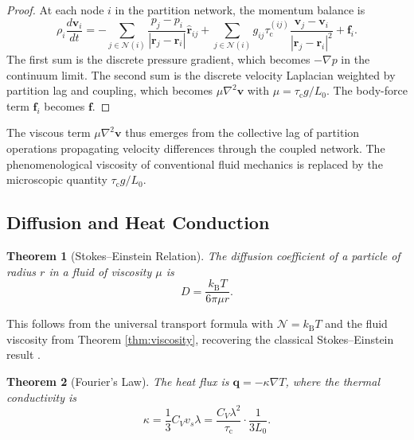 \documentclass[twocolumn,10pt,a4paper]{article}
\newtheorem{theorem}{Theorem}[section]
\theoremstyle{definition}
\theoremstyle{remark}
\newcommand{\kB}{k_{\mathrm{B}}}
\newcommand{\tauC}{\tau_{\mathrm{c}}}
\newcommand{\Norm}{\mathcal{N}}
\begin{document}
\begin{proof}
At each node $i$ in the partition network, the momentum balance is
\[
\rho_i \frac{d\mathbf{v}_i}{dt} = -\sum_{j \in \mathcal{N}(i)} \frac{p_j - p_i}{|\mathbf{r}_j - \mathbf{r}_i|}\hat{\mathbf{r}}_{ij} + \sum_{j \in \mathcal{N}(i)} g_{ij}\tauC^{(ij)}\frac{\mathbf{v}_j - \mathbf{v}_i}{|\mathbf{r}_j - \mathbf{r}_i|^2} + \mathbf{f}_i.
\]
The first sum is the discrete pressure gradient, which becomes $-\nabla p$ in the continuum limit. The second sum is the discrete velocity Laplacian weighted by partition lag and coupling, which becomes $\mu \nabla^2 \mathbf{v}$ with $\mu = \tauC g / L_0$. The body-force term $\mathbf{f}_i$ becomes $\mathbf{f}$.
\end{proof}

The viscous term $\mu \nabla^2 \mathbf{v}$ thus emerges from the collective lag of partition operations propagating velocity differences through the coupled network. The phenomenological viscosity of conventional fluid mechanics \citep{batchelor1967,landau1987fluid} is replaced by the microscopic quantity $\tauC g / L_0$.

\subsection{Diffusion and Heat Conduction}

\begin{theorem}[Stokes--Einstein Relation]
\label{thm:stokes_einstein}
The diffusion coefficient of a particle of radius $r$ in a fluid of viscosity $\mu$ is
\begin{equation}
D = \frac{\kB T}{6\pi \mu r}.
\label{eq:stokes_einstein}
\end{equation}
\end{theorem}

This follows from the universal transport formula with $\Norm = \kB T$ and the fluid viscosity from Theorem \ref{thm:viscosity}, recovering the classical Stokes--Einstein result \citep{einstein1905brownian}.

\begin{theorem}[Fourier's Law]
\label{thm:fourier}
The heat flux is $\mathbf{q} = -\kappa \nabla T$, where the thermal conductivity is
\begin{equation}
\kappa = \frac{1}{3} C_V v_s \lambda = \frac{C_V \lambda^2}{\tauC}\cdot\frac{1}{3 L_0}.
\label{eq:fourier}
\end{equation}
\end{theorem}
\end{document}
